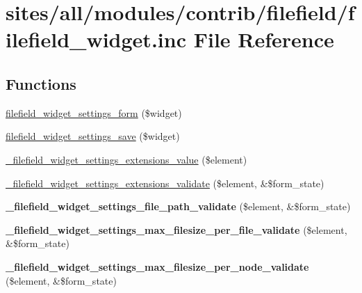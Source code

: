 \hypertarget{filefield__widget_8inc}{
\section{sites/all/modules/contrib/filefield/filefield\_\-widget.inc File Reference}
\label{filefield__widget_8inc}
}
\subsection*{Functions}
\begin{CompactItemize}
\item 
\hyperlink{filefield__widget_8inc_bc36ff4a1ee9c352319ca022556d9f20}{filefield\_\-widget\_\-settings\_\-form} (\$widget)
\item 
\hyperlink{filefield__widget_8inc_aacc98c07dfd3a814c8d32146579c062}{filefield\_\-widget\_\-settings\_\-save} (\$widget)
\item 
\hyperlink{filefield__widget_8inc_a6d640500605541cbd124455806e05a1}{\_\-filefield\_\-widget\_\-settings\_\-extensions\_\-value} (\$element)
\item 
\hyperlink{filefield__widget_8inc_016c555f0ce2e7f71d2b371af07ec4c8}{\_\-filefield\_\-widget\_\-settings\_\-extensions\_\-validate} (\$element, \&\$form\_\-state)
\item 
\hypertarget{filefield__widget_8inc_570e364a87d2b6506fa1752169d4219e}{
\textbf{\_\-filefield\_\-widget\_\-settings\_\-file\_\-path\_\-validate} (\$element, \&\$form\_\-state)}
\label{filefield__widget_8inc_570e364a87d2b6506fa1752169d4219e}

\item 
\hypertarget{filefield__widget_8inc_0d28b4cd0d6b8bdc5350e69b1b7f19a4}{
\textbf{\_\-filefield\_\-widget\_\-settings\_\-max\_\-filesize\_\-per\_\-file\_\-validate} (\$element, \&\$form\_\-state)}
\label{filefield__widget_8inc_0d28b4cd0d6b8bdc5350e69b1b7f19a4}

\item 
\hypertarget{filefield__widget_8inc_619ea7c27a2b9b9e047579e5381545fc}{
\textbf{\_\-filefield\_\-widget\_\-settings\_\-max\_\-filesize\_\-per\_\-node\_\-validate} (\$element, \&\$form\_\-state)}
\label{filefield__widget_8inc_619ea7c27a2b9b9e047579e5381545fc}


\end{CompactItemize}
